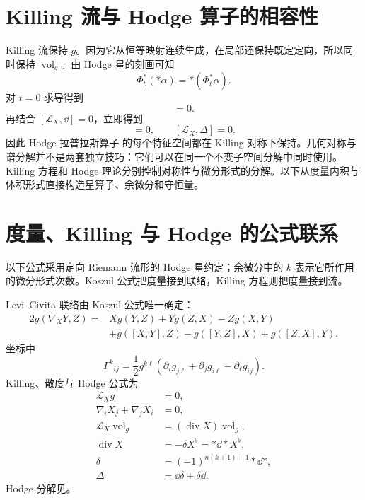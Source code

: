 


\section{Killing 流与 Hodge 算子的相容性}

Killing 流保持 $g$。因为它从恒等映射连续生成，在局部还保持既定定向，所以同时保持 $\operatorname{vol}_g$。由 Hodge 星的刻画可知
\[
\Phi_t^*(*\alpha)=*(\Phi_t^*\alpha).
\]
对 $t=0$ 求导得到
\begin{equation*}[\mathcal L_X,*]=0.
\end{equation*}
再结合 $[\mathcal L_X,\dd]=0$，立即得到
\begin{equation*}[\mathcal L_X,\delta]=0,
\qquad
[\mathcal L_X,\Delta]=0.
\end{equation*}
因此 Hodge 拉普拉斯算子 的每个特征空间都在 Killing 对称下保持。几何对称与谱分解并不是两套独立技巧：它们可以在同一个不变子空间分解中同时使用。
Killing 方程和 Hodge 理论分别控制对称性与微分形式的分解。以下从度量内积与体积形式直接构造星算子、余微分和守恒量。




\section{度量、Killing 与 Hodge 的公式联系}
以下公式采用定向 Riemann 流形的 Hodge 星约定；余微分中的 $k$ 表示它所作用的微分形式次数。Koszul 公式把度量接到联络，Killing 方程则把度量接到流。
\begin{note}[公式之间的联系]
Levi--Civita 联络由 Koszul 公式唯一确定：
\[
\begin{aligned}
2g(\nabla_XY,Z)
={}&Xg(Y,Z)+Yg(Z,X)-Zg(X,Y)\\
&+g([X,Y],Z)-g([Y,Z],X)+g([Z,X],Y).
\end{aligned}
\]
坐标中
\[
\Gamma^k{}_{ij}
=\frac12g^{k\ell}
(\partial_i g_{j\ell}+\partial_j g_{i\ell}-\partial_\ell g_{ij}).
\]
Killing、散度与 Hodge 公式为
\begin{align*}
\mathcal L_Xg&=0,\\
\nabla_iX_j+\nabla_jX_i&=0,\\
\mathcal L_X\operatorname{vol}_g&=(\operatorname{div} X)\operatorname{vol}_g,\\
\operatorname{div} X&=-\delta X^\flat=*\dd*X^\flat,\\
\delta&=(-1)^{n(k+1)+1}*\dd*,\\
\Delta&=\dd\delta+\delta\dd.
\end{align*}
Hodge 分解见。
\end{note}


